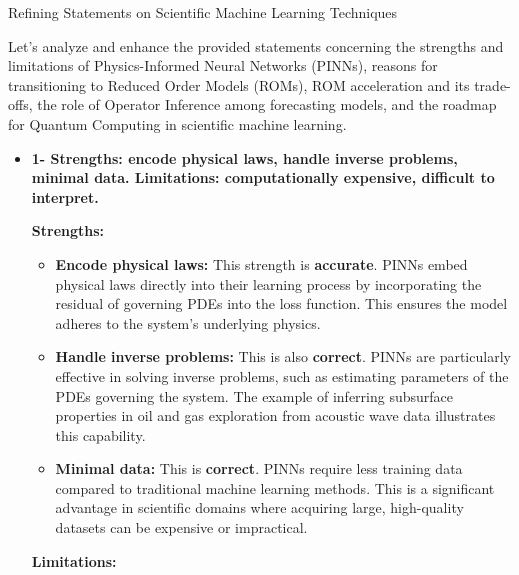 \documentclass[
]{article}
\author{}
\date{}
\begin{document}
{Refining Statements on Scientific Machine Learning
Techniques}\label{refining-statements-on-scientific-machine-learning-techniques}

Let's analyze and enhance the provided statements concerning the
strengths and limitations of Physics-Informed Neural Networks (PINNs),
reasons for transitioning to Reduced Order Models (ROMs), ROM
acceleration and its trade-offs, the role of Operator Inference among
forecasting models, and the roadmap for Quantum Computing in scientific
machine learning.

\begin{itemize}
\item
  \textbf{1- Strengths: encode physical laws, handle inverse problems,
  minimal data. Limitations: computationally expensive, difficult to
  interpret.}

  \textbf{Strengths:}

  \begin{itemize}
  
  \item
    \textbf{Encode physical laws:} This strength is \textbf{accurate}.
    PINNs embed physical laws directly into their learning process by
    incorporating the residual of governing PDEs into the loss function.
    This ensures the model adheres to the system's underlying physics.
  \item
    \textbf{Handle inverse problems:} This is also \textbf{correct}.
    PINNs are particularly effective in solving inverse problems, such
    as estimating parameters of the PDEs governing the system. The
    example of inferring subsurface properties in oil and gas
    exploration from acoustic wave data illustrates this capability.
  \item
    \textbf{Minimal data:} This is \textbf{correct}. PINNs require less
    training data compared to traditional machine learning methods. This
    is a significant advantage in scientific domains where acquiring
    large, high-quality datasets can be expensive or impractical.
  \end{itemize}

  \textbf{Limitations:}

  \begin{itemize}
  

\end{itemize}
\end{itemize}
\end{document}
